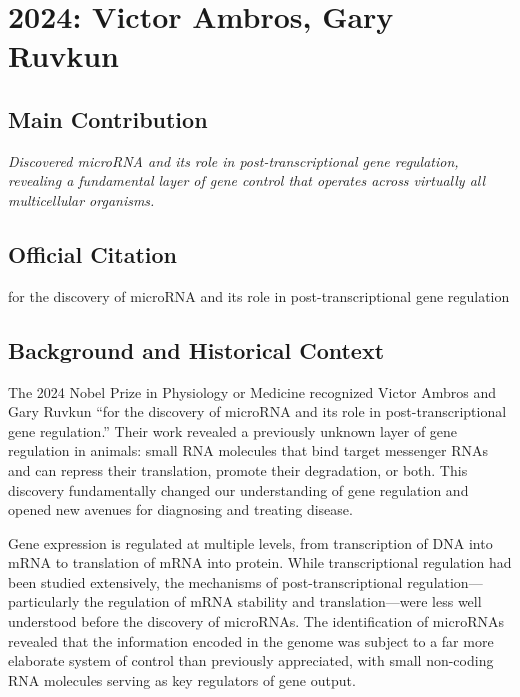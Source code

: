 \chapter[2024 --- Ambros et al.]{2024: Victor Ambros, Gary Ruvkun}
\label{ch:2024_Ambros}

\section*{Main Contribution}

\textit{Discovered microRNA and its role in post-transcriptional gene regulation, revealing a fundamental layer of gene control that operates across virtually all multicellular organisms.}\cite{nobel-2024,lecture-2024}

\section{Official Citation}

for the discovery of microRNA and its role in post-transcriptional gene regulation

\section{Background and Historical Context}

The 2024 Nobel Prize in Physiology or Medicine recognized Victor Ambros and Gary Ruvkun ``for the discovery of microRNA and its role in post-transcriptional gene regulation.'' Their work revealed a previously unknown layer of gene regulation in animals: small RNA molecules that bind target messenger RNAs and can repress their translation, promote their degradation, or both. This discovery fundamentally changed our understanding of gene regulation and opened new avenues for diagnosing and treating disease.

Gene expression is regulated at multiple levels, from transcription of DNA into mRNA to translation of mRNA into protein. While transcriptional regulation had been studied extensively, the mechanisms of post-transcriptional regulation---particularly the regulation of mRNA stability and translation---were less well understood before the discovery of microRNAs. The identification of microRNAs revealed that the information encoded in the genome was subject to a far more elaborate system of control than previously appreciated, with small non-coding RNA molecules serving as key regulators of gene output.

